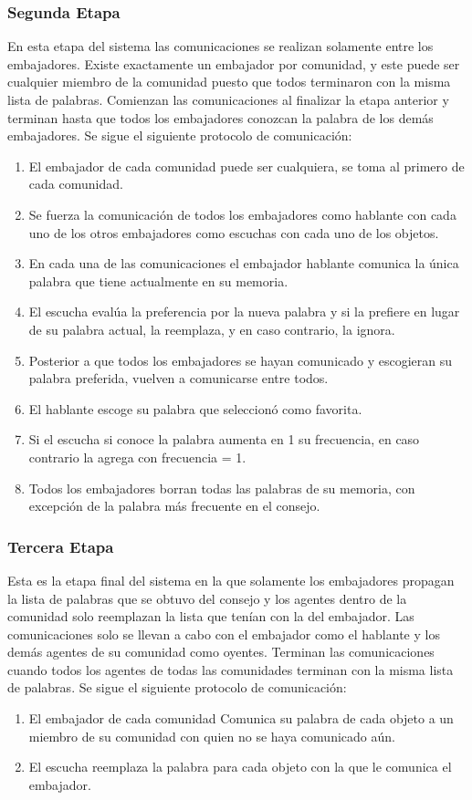 \documentclass[runningheads]{llncs}
\begin{document}
\subsubsection{Segunda Etapa}
En esta etapa del sistema las comunicaciones se realizan solamente entre los embajadores. Existe exactamente un embajador por comunidad, y este puede ser cualquier miembro de la comunidad puesto que todos terminaron con la misma lista de palabras. Comienzan las comunicaciones al finalizar la etapa anterior y terminan hasta que todos los embajadores conozcan la palabra de los demás embajadores.
Se sigue el siguiente protocolo de comunicación:
\begin{enumerate}
	\item El embajador de cada comunidad puede ser cualquiera, se toma al primero de cada comunidad.
	\item Se fuerza la comunicación de todos los embajadores como hablante con cada uno de los otros embajadores como escuchas con cada uno de los objetos.
	\item En cada una de las comunicaciones el embajador hablante comunica la única palabra que tiene actualmente en su memoria.
	\item El escucha evalúa la preferencia por la nueva palabra y si la prefiere en lugar de su palabra actual, la reemplaza, y en caso contrario, la ignora.
	\item Posterior a que todos los embajadores se hayan comunicado y escogieran su palabra preferida, vuelven a comunicarse entre todos.
	\item El hablante escoge su palabra que seleccionó como favorita.
	\item Si el escucha si conoce la palabra aumenta en 1 su frecuencia, en caso contrario la agrega con frecuencia = 1.
	\item Todos los embajadores borran todas las palabras de su memoria, con excepción de la palabra más frecuente en el consejo.
\end{enumerate}
\subsubsection{Tercera Etapa}
Esta es la etapa final del sistema en la que solamente los embajadores propagan la lista de palabras que se obtuvo del consejo y los agentes dentro de la comunidad solo reemplazan la lista que tenían con la del embajador. Las comunicaciones solo se llevan a cabo con el embajador como el hablante y los demás agentes de su comunidad como oyentes. Terminan las comunicaciones cuando todos los agentes de todas las comunidades terminan con la misma lista de palabras.
Se sigue el siguiente protocolo de comunicación:
\begin{enumerate}
	\item El embajador de cada comunidad Comunica su palabra de cada objeto a un miembro de su comunidad con quien no se haya comunicado aún.
	\item El escucha reemplaza la palabra para cada objeto con la que le comunica el embajador.
\end{enumerate}
\end{document}
